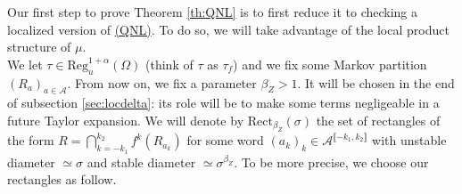 \documentclass[a4paper]{article}
\newtheorem{lemma}[theorem]{Lemma}
\theoremstyle{definition}
\newtheorem{definition}{Definition}[section]
\begin{document}



Our first step to prove Theorem \ref{th:QNL} is to first reduce it to checking a localized version of \hyperref[QNL]{(QNL)}. To do so, we will take advantage of the local product structure of $\mu$. \\

We let $\tau \in \text{Reg}_u^{1+\alpha}(\Omega)$ (think of $\tau$ as $\tau_f$) and we fix some Markov partition $(R_a)_{a \in \mathcal{A}}$. From now on, we fix a parameter $\beta_Z >1$. It will be chosen in the end of subsection \ref{sec:locdelta}: its role will be to make some terms negligeable in a future Taylor expansion. We will denote by $\text{Rect}_{\beta_Z}(\sigma)$ the set of rectangles of the form $R = \bigcap_{k = -k_1}^{k_2} f^k(R_{a_k})$ for some word $(a_k)_{k} \in \mathcal{A}^{\llbracket -k_1, k_2 \rrbracket}$ with unstable diameter $\simeq \sigma$ and stable diameter $\simeq \sigma^{\beta_Z}$. To be more precise, we choose our rectangles as follow. \\
\end{document}
